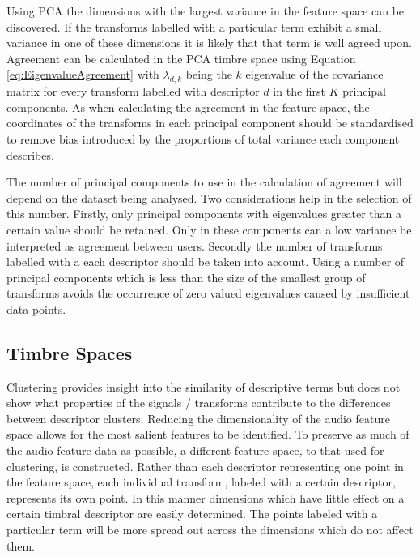 			Using PCA the dimensions with the largest variance in the feature space can be discovered. If the
			transforms labelled with a particular term exhibit a small variance in one of these dimensions it
			is likely that that term is well agreed upon. Agreement can be calculated in the PCA timbre space
			using Equation \ref{eq:EigenvalueAgreement} with $\lambda_{d,k}$ being the $k$ eigenvalue
			of the covariance matrix for every transform labelled with descriptor $d$ in the first $K$
			principal components. As when calculating the agreement in the feature space, the coordinates of
			the transforms in each principal component should be standardised to remove bias introduced by the
			proportions of total variance each component describes.

			The number of principal components to use in the calculation of agreement will depend on the
			dataset being analysed. Two considerations help in the selection of this number. Firstly, only
			principal components with eigenvalues greater than a certain value should be retained. Only in
			these components can a low variance be interpreted as agreement between users. Secondly the number
			of transforms labelled with a each descriptor should be taken into account. Using a number of
			principal components which is less than the size of the smallest group of transforms avoids the
			occurrence of zero valued eigenvalues caused by insufficient data points.

	\subsection{Timbre Spaces}
	\label{sec:TimbreEvaluation-Analysis-TimbreSpaces}
		Clustering provides insight into the similarity of descriptive terms but does not show what properties of
		the signals / transforms contribute to the differences between descriptor clusters. Reducing the
		dimensionality of the audio feature space allows for the most salient features to be identified. To
		preserve as much of the audio feature data as possible, a different feature space, to that used for
		clustering, is constructed. Rather than each descriptor representing one point in the feature space, each
		individual transform, labeled with a certain descriptor, represents its own point. In this manner
		dimensions which have little effect on a certain timbral descriptor are easily determined. The points
		labeled with a particular term will be more spread out across the dimensions which do not affect them. 
		
